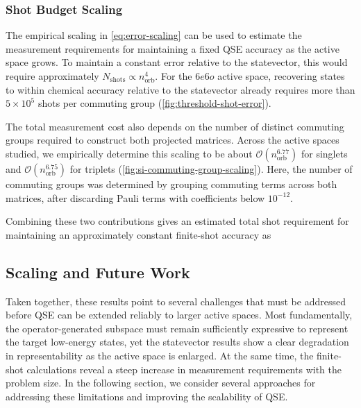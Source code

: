 \subsubsection{Shot Budget Scaling}
\label{sec:shot-budget-scaling}
The empirical scaling in \cref{eq:error-scaling} can be used to estimate the measurement requirements for maintaining a fixed QSE accuracy as the active space grows. To maintain a constant error relative to the statevector, this would require approximately $N_{\mathrm{shots}} \propto n_{\mathrm{orb}}^4$. 
For the $6e6o$ active space, recovering states to within chemical accuracy relative to the statevector already requires more than $5 \times 10^{5}$ shots per commuting group (\cref{fig:threshold-shot-error}). 

The total measurement cost also depends on the number of distinct commuting groups required to construct both projected matrices. 
Across the active spaces studied, we empirically determine this scaling to be about $\mathcal{O}\!\left(n_{\mathrm{orb}}^{6.77}\right)$ for singlets and $\mathcal{O}\!\left(n_{\mathrm{orb}}^{6.75}\right)$ for triplets (\cref{fig:si-commuting-group-scaling}). 
Here, the number of commuting groups was determined by grouping commuting terms across both matrices, after discarding Pauli terms with coefficients below $10^{-12}$. 

Combining these two contributions gives an estimated total shot requirement for maintaining an approximately constant finite-shot accuracy as
\TotalShotScalingEquation

\subsection{Scaling and Future Work}
Taken together, these results point to several challenges that must be addressed before QSE can be extended reliably to larger active spaces. 
Most fundamentally, the operator-generated subspace must remain sufficiently expressive to represent the target low-energy states, yet the statevector results show a clear degradation in representability as the active space is enlarged.
At the same time, the finite-shot calculations reveal a steep increase in measurement requirements with the problem size.
In the following section, we consider several approaches for addressing these limitations and improving the scalability of QSE. 

